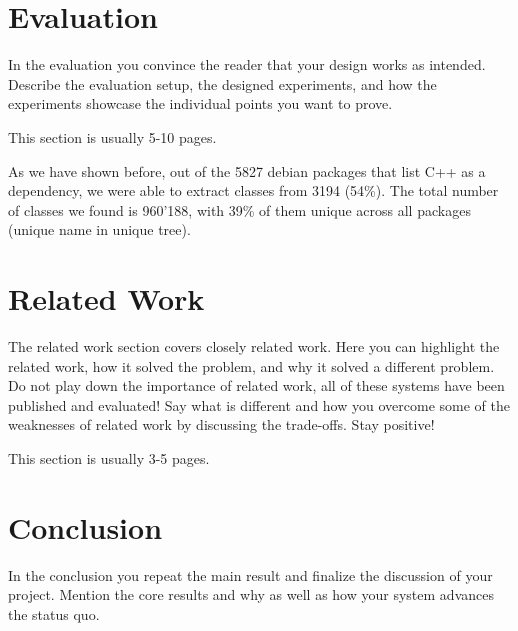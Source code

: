 \documentclass[a4paper,11pt,oneside]{report}
\begin{document}



\chapter{Evaluation}

In the evaluation you convince the reader that your design works as intended.
Describe the evaluation setup, the designed experiments, and how the
experiments showcase the individual points you want to prove.

This section is usually 5-10 pages.



As we have shown before, out of the 5827 debian packages that list C++ as a dependency, we were able to extract classes from 3194 (54\%).
The total number of classes we found is 960'188, with 39\% of them unique across all packages (unique name in unique tree).



\chapter{Related Work}

The related work section covers closely related work. Here you can highlight
the related work, how it solved the problem, and why it solved a different
problem. Do not play down the importance of related work, all of these
systems have been published and evaluated! Say what is different and how
you overcome some of the weaknesses of related work by discussing the 
trade-offs. Stay positive!

This section is usually 3-5 pages.



\chapter{Conclusion}

In the conclusion you repeat the main result and finalize the discussion of
your project. Mention the core results and why as well as how your system
advances the status quo.
\end{document}
